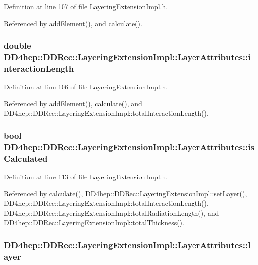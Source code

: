 Definition at line 107 of file LayeringExtensionImpl.h.

Referenced by addElement(), and calculate().\hypertarget{struct_d_d4hep_1_1_d_d_rec_1_1_layering_extension_impl_1_1_layer_attributes_a8be7b3707f08f24e5738568783a67f7e}{
\subsubsection[{interactionLength}]{\setlength{\rightskip}{0pt plus 5cm}double {\bf DD4hep::DDRec::LayeringExtensionImpl::LayerAttributes::interactionLength}}}
\label{struct_d_d4hep_1_1_d_d_rec_1_1_layering_extension_impl_1_1_layer_attributes_a8be7b3707f08f24e5738568783a67f7e}


Definition at line 106 of file LayeringExtensionImpl.h.

Referenced by addElement(), calculate(), and DD4hep::DDRec::LayeringExtensionImpl::totalInteractionLength().\hypertarget{struct_d_d4hep_1_1_d_d_rec_1_1_layering_extension_impl_1_1_layer_attributes_a0ddd6974f8568e8b28e3a258384ac582}{
\subsubsection[{isCalculated}]{\setlength{\rightskip}{0pt plus 5cm}bool {\bf DD4hep::DDRec::LayeringExtensionImpl::LayerAttributes::isCalculated}}}
\label{struct_d_d4hep_1_1_d_d_rec_1_1_layering_extension_impl_1_1_layer_attributes_a0ddd6974f8568e8b28e3a258384ac582}


Definition at line 113 of file LayeringExtensionImpl.h.

Referenced by calculate(), DD4hep::DDRec::LayeringExtensionImpl::setLayer(), DD4hep::DDRec::LayeringExtensionImpl::totalInteractionLength(), DD4hep::DDRec::LayeringExtensionImpl::totalRadiationLength(), and DD4hep::DDRec::LayeringExtensionImpl::totalThickness().\hypertarget{struct_d_d4hep_1_1_d_d_rec_1_1_layering_extension_impl_1_1_layer_attributes_af0bbd3d9f7b9b1297b6cc79deaf05147}{
\subsubsection[{layer}]{ {\bf DD4hep::DDRec::LayeringExtensionImpl::LayerAttributes::layer}}}
\label{struct_d_d4hep_1_1_d_d_rec_1_1_layering_extension_impl_1_1_layer_attributes_af0bbd3d9f7b9b1297b6cc79deaf05147}


